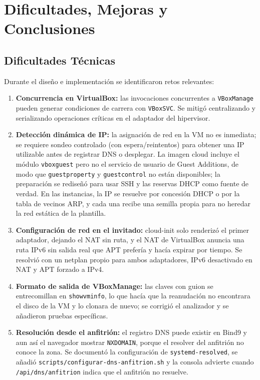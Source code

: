 \section{Dificultades, Mejoras y Conclusiones}

\subsection{Dificultades Técnicas}
Durante el diseño e implementación se identificaron retos relevantes:
\begin{enumerate}
    \item \textbf{Concurrencia en VirtualBox:} las invocaciones concurrentes a \texttt{VBoxManage} pueden generar condiciones de carrera con \texttt{VBoxSVC}. Se mitigó centralizando y serializando operaciones críticas en el adaptador del hipervisor.
    \item \textbf{Detección dinámica de IP:} la asignación de red en la VM no es inmediata; se requiere sondeo controlado (con espera/reintentos) para obtener una IP utilizable antes de registrar DNS o desplegar. La imagen cloud incluye el módulo \texttt{vboxguest} pero no el servicio de usuario de Guest Additions, de modo que \texttt{guestproperty} y \texttt{guestcontrol} no están disponibles; la preparación se rediseñó para usar SSH y las reservas DHCP como fuente de verdad. En las instancias, la IP se resuelve por concesión DHCP o por la tabla de vecinos ARP, y cada una recibe una semilla propia para no heredar la red estática de la plantilla.
    \item \textbf{Configuración de red en el invitado:} cloud-init solo renderizó el primer adaptador, dejando el NAT sin ruta, y el NAT de VirtualBox anuncia una ruta IPv6 sin salida real que APT prefería y hacía expirar por tiempo. Se resolvió con un netplan propio para ambos adaptadores, IPv6 desactivado en NAT y APT forzado a IPv4.
    \item \textbf{Formato de salida de VBoxManage:} las claves con guion se entrecomillan en \texttt{showvminfo}, lo que hacía que la reanudación no encontrara el disco de la VM y lo clonara de nuevo; se corrigió el analizador y se añadieron pruebas específicas.
    \item \textbf{Resolución desde el anfitrión:} el registro DNS puede existir en Bind9 y aun así el navegador mostrar \texttt{NXDOMAIN}, porque el resolver del anfitrión no conoce la zona. Se documentó la configuración de \texttt{systemd-resolved}, se añadió \texttt{scripts/configurar-dns-anfitrion.sh} y la consola advierte cuando \texttt{/api/dns/anfitrion} indica que el anfitrión no resuelve.

\end{enumerate}

